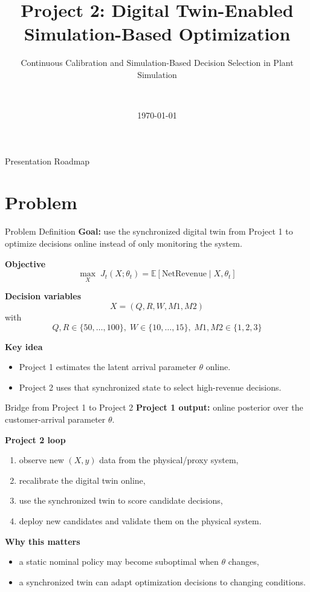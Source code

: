 \documentclass[aspectratio=169,11pt]{beamer}
\title[Digital Twin SimOpt]{Project 2: Digital Twin-Enabled Simulation-Based Optimization}
\subtitle{Continuous Calibration and Simulation-Based Decision Selection in Plant Simulation}
\author{\StudentName \\ \small \StudentID}
\institute{\CourseName \\ \small Instructor: \InstructorName}
\date{\today}
\begin{document}
\begin{frame}
    \titlepage
\end{frame}

\begin{frame}{Presentation Roadmap}
    \tableofcontents
\end{frame}

\section{Problem}

\begin{frame}{Problem Definition}
    \textbf{Goal:} use the synchronized digital twin from Project 1 to optimize decisions online instead of only monitoring the system.

    \vspace{0.4cm}
    \textbf{Objective}
    \[
    \max_X \; J_t(X;\theta_t)=\mathbb{E}[\text{NetRevenue}\mid X,\theta_t]
    \]

    \textbf{Decision variables}
    \[
    X=(Q,R,W,M1,M2)
    \]
    with
    \[
    Q,R \in \{50,\dots,100\},\;
    W \in \{10,\dots,15\},\;
    M1,M2 \in \{1,2,3\}
    \]

    \textbf{Key idea}
    \begin{itemize}
        \item Project 1 estimates the latent arrival parameter $\theta$ online.
        \item Project 2 uses that synchronized state to select high-revenue decisions.
    \end{itemize}
\end{frame}

\begin{frame}{Bridge from Project 1 to Project 2}
    \textbf{Project 1 output:} online posterior over the customer-arrival parameter $\theta$.

    \vspace{0.4cm}
    \textbf{Project 2 loop}
    \begin{enumerate}
        \item observe new \((X,y)\) data from the physical/proxy system,
        \item recalibrate the digital twin online,
        \item use the synchronized twin to score candidate decisions,
        \item deploy new candidates and validate them on the physical system.
    \end{enumerate}

    \vspace{0.4cm}
    \textbf{Why this matters}
    \begin{itemize}
        \item a static nominal policy may become suboptimal when $\theta$ changes,
        \item a synchronized twin can adapt optimization decisions to changing conditions.
    \end{itemize}
\end{frame}
\end{document}
